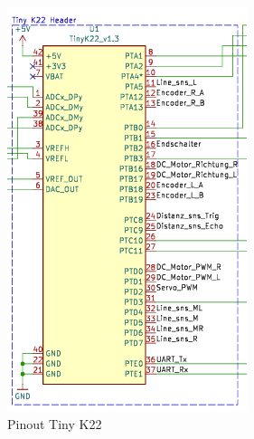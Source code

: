 \begin{figure}[h]
\centering
\begin{minipage}[b]{0.45\textwidth}
  \centering
  \includegraphics[width=\textwidth]{assets/ET/Software/Tiny_Pinout.png}
  \caption{Pinout Tiny K22}
  \label{fig:Pinout TinyK22}
\end{minipage}
\hspace{0.05\textwidth} %
\begin{minipage}[b]{0.45\textwidth}
  \centering

\end{minipage}
\end{figure}
